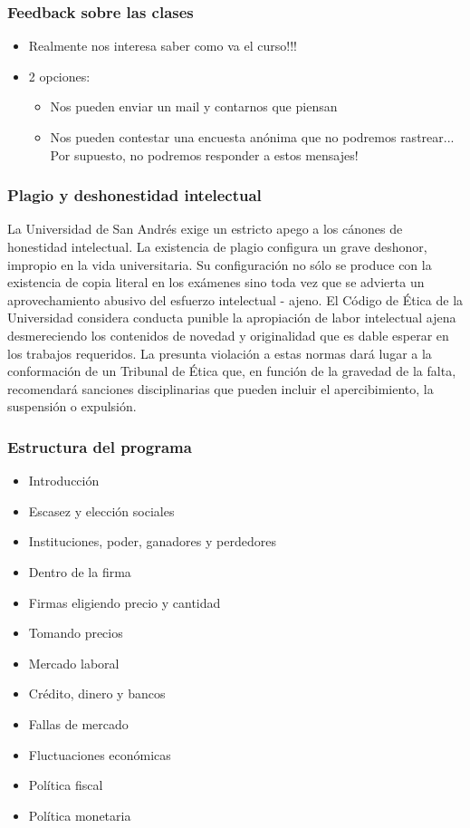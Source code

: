 \documentclass[14pt]{beamer}
\begin{document}
\begin{frame}
\frametitle{Feedback sobre las clases}
\begin{itemize}
    \item Realmente nos interesa saber como va el curso!!! \vspace{2mm}
    \item 2 opciones: \vspace{2mm}
        \begin{itemize}
            \item Nos pueden enviar un mail y contarnos que piensan 
            \item Nos pueden contestar una encuesta anónima que no podremos rastrear... Por supuesto, no podremos responder a estos mensajes!
  
        \end{itemize}
\end{itemize}
\end{frame}

\begin{frame}
\frametitle{Plagio y deshonestidad intelectual}
\small{
    La Universidad de San Andrés exige un estricto apego a los cánones de honestidad intelectual. La existencia de plagio configura un grave deshonor, impropio en la vida universitaria. Su configuración no sólo se produce con la existencia de copia literal en los exámenes sino toda vez que se advierta un aprovechamiento abusivo del esfuerzo intelectual  - ajeno. El Código de Ética de la Universidad considera conducta punible la apropiación de labor intelectual ajena desmereciendo los contenidos de novedad y originalidad que es dable esperar en los trabajos requeridos. La presunta violación a estas normas dará lugar a la conformación de un Tribunal de Ética que, en función de la gravedad de la falta, recomendará sanciones disciplinarias que pueden incluir el apercibimiento, la suspensión o expulsión.}
\end{frame}

\begin{frame}
\frametitle{Estructura del programa}
\begin{itemize}
\begin{itemize}
    \item Introducción
    \item Escasez y elección
    \itemInteracciones sociales
    \item Instituciones, poder, ganadores y perdedores
    \item Dentro de la firma
    \item Firmas eligiendo precio y cantidad
    \item Tomando precios
    \item Mercado laboral
    \item Crédito, dinero y bancos
    \item Fallas de mercado
    \item Fluctuaciones económicas
    \item Política fiscal
    \item Política monetaria
\end{itemize}
\end{itemize}
\end{frame}
\end{document}
